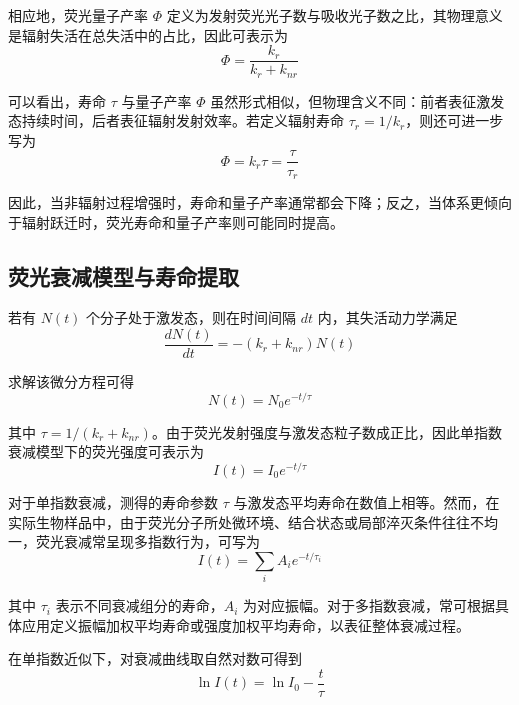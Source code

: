 相应地，荧光量子产率 $\Phi$ 定义为发射荧光光子数与吸收光子数之比，其物理意义是辐射失活在总失活中的占比，因此可表示为
\begin{equation}
  \Phi=\frac{k_r}{k_r+k_{nr}}
\end{equation}

可以看出，寿命 $\tau$ 与量子产率 $\Phi$ 虽然形式相似，但物理含义不同：前者表征激发态持续时间，后者表征辐射发射效率。若定义辐射寿命 $\tau_r=1/k_r$，则还可进一步写为
\begin{equation}
  \Phi = k_r\tau=\frac{\tau}{\tau_r}
\end{equation}

因此，当非辐射过程增强时，寿命和量子产率通常都会下降；反之，当体系更倾向于辐射跃迁时，荧光寿命和量子产率则可能同时提高。



\subsection{荧光衰减模型与寿命提取}\label{5.1.2}

若有 $N(t)$ 个分子处于激发态，则在时间间隔 $dt$ 内，其失活动力学满足
\begin{equation}
  \frac{dN(t)}{dt}=-(k_r+k_{nr})N(t)
\end{equation}

求解该微分方程可得
\begin{equation}
  N(t)=N_0 e^{-t/\tau}
\end{equation}

其中 $\tau=1/(k_r+k_{nr})$。由于荧光发射强度与激发态粒子数成正比，因此单指数衰减模型下的荧光强度可表示为
\begin{equation}
  I(t)=I_0 e^{-t/\tau}
\end{equation}

对于单指数衰减，测得的寿命参数 $\tau$ 与激发态平均寿命在数值上相等。然而，在实际生物样品中，由于荧光分子所处微环境、结合状态或局部淬灭条件往往不均一，荧光衰减常呈现多指数行为，可写为
\begin{equation}
  I(t)=\sum_i A_i e^{-t/\tau_i}
\end{equation}

其中 $\tau_i$ 表示不同衰减组分的寿命，$A_i$ 为对应振幅。对于多指数衰减，常可根据具体应用定义振幅加权平均寿命或强度加权平均寿命，以表征整体衰减过程。

在单指数近似下，对衰减曲线取自然对数可得到
\begin{equation}
  \ln I(t)=\ln I_0-\frac{t}{\tau}
\end{equation}

